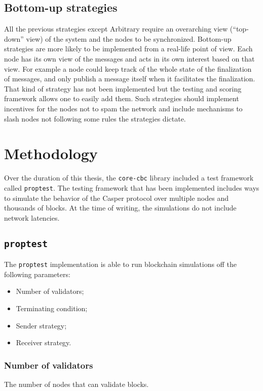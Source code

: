 \subsection{Bottom-up strategies}
\label{ssec:bottomUpStrats}
All the previous strategies except Arbitrary require an overarching view
(``top-down'' view) of the system and the nodes to be synchronized.
Bottom-up strategies are more likely to be implemented from a real-life point of
view. Each node has its own view of the messages and acts in its own interest
based on that view.
For example a node could keep track of the whole state of the finalization of
messages, and only publish a message itself when it facilitates the
finalization. That kind of strategy has not been implemented but the testing and
scoring framework allows one to easily add them.
Such strategies should implement incentives for the nodes not to spam the
network and include mechanisms to slash nodes not following some rules the
strategies dictate.

\section{Methodology}
Over the duration of this thesis, the \texttt{core-cbc} library included a
test framework called \texttt{proptest}. The testing framework that has been
implemented includes ways to simulate the behavior of the Casper protocol over
multiple nodes and thousands of blocks. At the time of
writing, the simulations do not include network latencies.

\subsection{\texttt{proptest}}
\label{ssec:proptest}

The \texttt{proptest} implementation is able to run blockchain simulations off
the following parameters:
\begin{itemize}
    \item Number of validators;
    \item Terminating condition;
    \item Sender strategy;
    \item Receiver strategy.
\end{itemize}

\subsubsection{Number of validators}
The number of nodes that can validate blocks.

